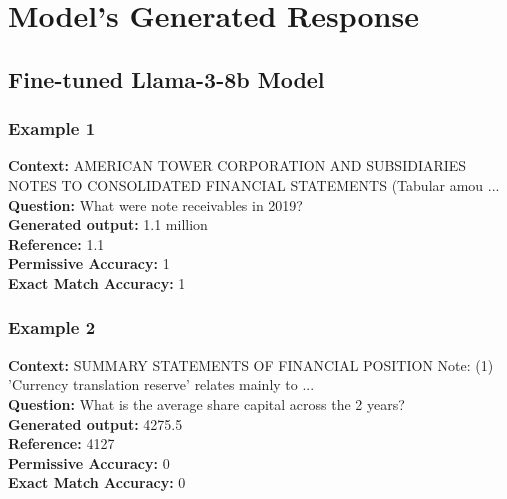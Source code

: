 \documentclass[logo,msc]{infthesis}           %
\begin{document}
\section{Model's Generated Response}

\subsection{Fine-tuned Llama-3-8b Model}

\subsubsection{Example 1}
\textbf{Context:} AMERICAN TOWER CORPORATION AND SUBSIDIARIES NOTES TO CONSOLIDATED FINANCIAL STATEMENTS (Tabular amou ...
\\
\textbf{Question:} What were note receivables in 2019?
\\
\textbf{Generated output:} 1.1 million
\\
\textbf{Reference:} 1.1
\\
\textbf{Permissive Accuracy:} 1
\\
\textbf{Exact Match Accuracy:} 1

\subsubsection{Example 2}
\textbf{Context:} SUMMARY STATEMENTS OF FINANCIAL POSITION Note: (1) 'Currency translation reserve' relates mainly to ...
\\
\textbf{Question:} What is the average share capital across the 2 years?
\\
\textbf{Generated output:} 4275.5
\\
\textbf{Reference:} 4127
\\
\textbf{Permissive Accuracy:} 0
\\
\textbf{Exact Match Accuracy:} 0
\end{document}
